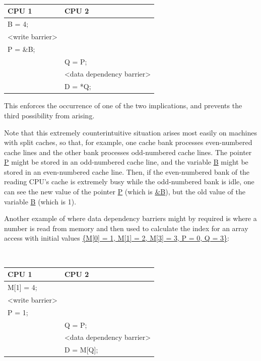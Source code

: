 \vspace{5pt}
\begin{minipage}[t]{\columnwidth}
\tt
\begin{tabular}{l|p{1.5in}}
	CPU 1 &		CPU 2 \\
	\hline
	B = 4; & \\
	<write barrier> & \\
	P = \&B; &	\\
		&	Q = P; \\
		&	<data dependency barrier> \\
		&	D = *Q; \\
\end{tabular}
\end{minipage}
\vspace{5pt}

This enforces the occurrence of one of the two implications, and prevents the
third possibility from arising.

Note that this extremely counterintuitive situation arises most easily on
machines with split caches, so that, for example, one cache bank processes
even-numbered cache lines and the other bank processes odd-numbered cache
lines.
The pointer \url{P} might be stored in an odd-numbered cache line, and the
variable \url{B} might be stored in an even-numbered cache line.  Then, if the
even-numbered bank of the reading CPU's cache is extremely busy while the
odd-numbered bank is idle, one can see the new value of the
pointer \url{P} (which is \url{&B}),
but the old value of the variable \url{B} (which is 1).

Another example of where data dependency barriers might by required is where a
number is read from memory and then used to calculate the index for an array
access with initial values
\url{{M[0] = 1, M[1] = 2, M[3] = 3, P = 0, Q = 3}}:

\vspace{5pt}
\begin{minipage}[t]{\columnwidth}
\tt
\begin{tabular}{l|p{1.5in}}
	CPU 1 &		CPU 2 \\
	\hline
	M[1] = 4; & \\
	<write barrier> & \\
	P = 1;	&	\\
		&	Q = P; \\
		&	<data dependency barrier> \\
		&	D = M[Q]; \\
\end{tabular}
\end{minipage}
\vspace{5pt}

